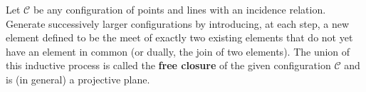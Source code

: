 Let $\mathcal{C}$ be any configuration of points and lines with an incidence relation. Generate successively larger configurations by introducing, at each step, a new element defined to be the meet of exactly two existing elements that do not yet have an element in common (or dually, the join of two elements). The union of this inductive process is called the \textbf{free closure} of the given configuration $\mathcal{C}$ and is (in general) a projective plane.

